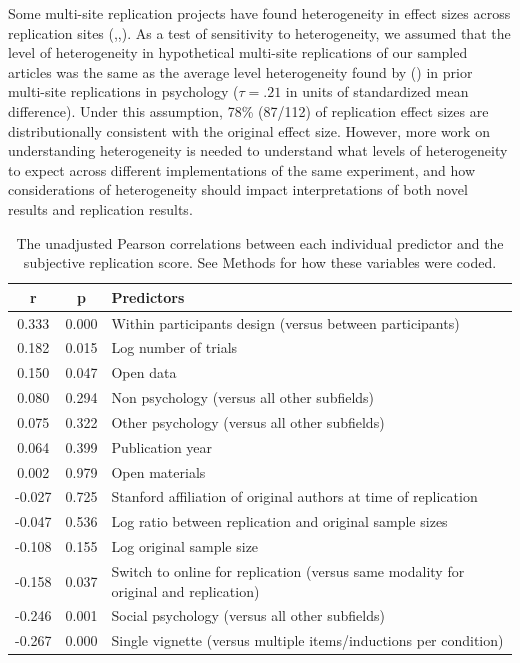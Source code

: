 \documentclass[
  english,
  a4paper,
]{article}
\begin{document}
Some multi-site replication projects have found heterogeneity in effect sizes across replication sites (,,). As a test of sensitivity to heterogeneity, we assumed that the level of heterogeneity in hypothetical multi-site replications of our sampled articles was the same as the average level heterogeneity found by () in prior multi-site replications in psychology (\(\tau=.21\) in units of standardized mean difference). Under this assumption, 78\% (87/112) of replication effect sizes are distributionally consistent with the original effect size. However, more work on understanding heterogeneity is needed to understand what levels of heterogeneity to expect across different implementations of the same experiment, and how considerations of heterogeneity should impact interpretations of both novel results and replication results.

\begin{table}[!h]
\centering
\caption{\label{tab:cor}The unadjusted Pearson correlations between each individual predictor and the subjective replication score. See Methods for how these variables were coded.}
\centering
\fontsize{10}{12}\selectfont
\begin{tabular}[t]{ccl}
\toprule
r & p & Predictors\\
\midrule
0.333 & 0.000 & Within participants design (versus between participants)\\
0.182 & 0.015 & Log number of  trials\\
0.150 & 0.047 & Open data\\
0.080 & 0.294 & Non psychology (versus all other subfields)\\
0.075 & 0.322 & Other psychology (versus all other subfields)\\
0.064 & 0.399 & Publication year\\
0.002 & 0.979 & Open materials\\
-0.027 & 0.725 & Stanford affiliation of original authors at time of replication\\
-0.047 & 0.536 & Log ratio between replication and original sample sizes\\
-0.108 & 0.155 & Log original sample size\\
-0.158 & 0.037 & Switch to online for replication (versus same modality for original and replication)\\
-0.246 & 0.001 & Social psychology (versus all other subfields)\\
-0.267 & 0.000 & Single vignette (versus multiple items/inductions per condition)\\
\bottomrule
\end{tabular}
\end{table}
\end{document}
